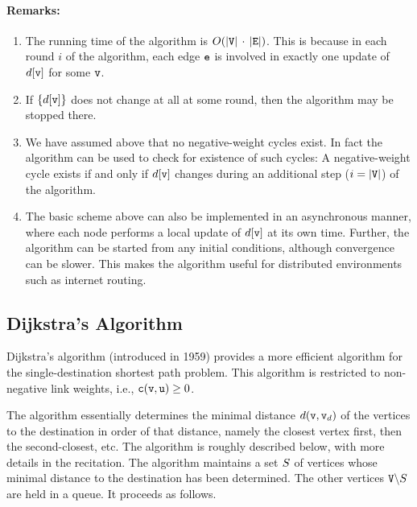 \paragraph{Remarks:}
\begin{enumerate}
  \item The running time of the algorithm is $O(|{\tt V}|\, \cdot \,|{\tt E}|)$. This is because in each round $i$ of the algorithm, each edge ${\tt e}$ is involved in exactly one update of $d[{\tt v}]$ for some ${\tt v}$.
  \item If $\{ d[{\tt v}]\}$ does not change at all at some round, then the algorithm may be stopped there.
  \item We have assumed above that no negative-weight cycles exist. In fact the algorithm can be used to check for existence of such cycles: A negative-weight cycle exists if and only if  $d[{\tt v}]$ changes during an additional step ($i = |{\tt V}|$) of the algorithm.
  \item The basic scheme above can also be implemented in an asynchronous manner, where each node performs a local update of $d[{\tt v}]$ at its own time. Further, the algorithm can be started from any initial conditions, although convergence can be slower. This makes the algorithm useful for distributed environments such as internet routing.
\end{enumerate}

\subsection{Dijkstra's Algorithm}
Dijkstra's algorithm (introduced in 1959) provides a more efficient algorithm for the single-destination shortest path problem. This algorithm is restricted to non-negative link weights, i.e., ${\tt c}({\tt v},{\tt u}) \ge 0$.

The algorithm essentially determines the minimal distance $d({\tt v},{\tt v}_d)$ of the vertices to the destination in order of that distance, namely the closest vertex first, then the second-closest, etc.  The algorithm is roughly described below, with more details in the recitation.
The algorithm maintains a set ${S}$ of vertices whose minimal distance to the destination has been determined. The other vertices ${\tt V}\backslash {S}$ are held in a queue. It proceeds as follows.

